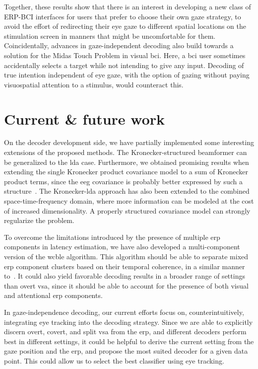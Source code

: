 Together, these results show that there is an interest in developing a new class of ERP-BCI
interfaces for users that prefer to choose their own gaze strategy, to
avoid the effort of redirecting their eye gaze to different spatial locations
on the stimulation screen in manners that might be uncomfortable for them.
Coincidentally, advances in gaze-independent decoding also build towards a
solution for the Midas Touch Problem in visual \ac{bci}.
Here, a \ac{bci} user sometimes accidentally selects a target while not intending
to give any input.
Decoding of true intention independent of eye
gaze, with the option of gazing without paying visuospatial attention to a
stimulus, would counteract this.

\section{Current \& future work}
On the decoder development side, we have partially implemented some interesting
extensions of the proposed methods.
The Kronecker-structured beamformer can be generalized to the \ac{lda} case.
Furthermore, we obtained promising results when extending the single
Kronecker product covariance model to a sum of Kronecker product terms, since
the \ac{eeg} covariance is probably better expressed by such a
structure~\cite{Bijma2005}.
The Kronecker-\ac{lda} approach has also been extended to the combined
space-time-frequency domain, where more information can be modeled at the cost
of increased dimensionality.
A properly structured covariance model can strongly regularize the problem.

To overcome the limitations introduced by the presence of multiple \ac{erp}
components in latency estimation, we have also developed a multi-component
version of the \ac{wcble} algorithm.
This algorithm should be able to separate mixed \ac{erp} component clusters
based on their temporal coherence, in a similar manner to~\textcite{Ouyang2017}.
It could also yield favorable decoding results in a broader range of settings
than overt \ac{vsa}, since it should be able to account for the presence of both
visual and attentional \ac{erp} components.

In gaze-independence decoding, our current efforts focus on,
counterintuitively, integrating eye tracking into the decoding strategy.
Since we are able to explicitly discern overt, covert, and split \ac{vsa} from
the \ac{erp}, and different decoders perform best in different settings, it
could be helpful to derive the current setting from the gaze position and the
\ac{erp}, and propose the most suited decoder for a given data point.
This could allow us to select the best classifier using eye tracking.

